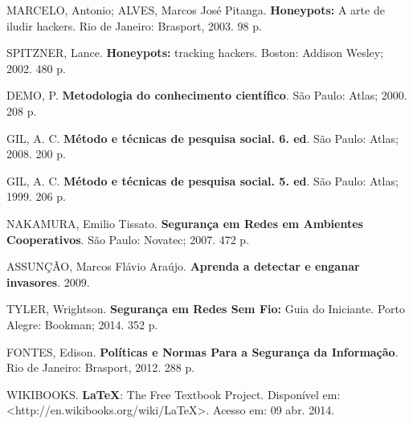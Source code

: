 \documentclass[12pt,openright,oneside,a4paper,english,french,spanish,brazil]{unifil}
\begin{document}
\begin{thebibliography}{99}

{MARCELO, Antonio; ALVES, Marcos José Pitanga. \textbf{Honeypots:} A arte de iludir hackers. Rio de Janeiro: Brasport, 2003. 98 p.}

{SPITZNER, Lance. \textbf{Honeypots:} tracking hackers. Boston: Addison Wesley; 2002. 480 p.}

{DEMO, P. \textbf{Metodologia do conhecimento científico}. São Paulo: Atlas; 2000. 208 p.}

{GIL, A. C. \textbf{Método e técnicas de pesquisa social. 6. ed}. São Paulo: Atlas; 2008. 200 p.}

{GIL, A. C. \textbf{Método e técnicas de pesquisa social. 5. ed}. São Paulo: Atlas; 1999. 206 p.}

{NAKAMURA, Emilio Tissato. \textbf{Segurança em Redes em Ambientes Cooperativos}. São Paulo: Novatec; 2007. 472 p.}

{ASSUNÇÃO, Marcos Flávio Araújo. \textbf{Aprenda a detectar e enganar invasores}. 2009.}

{TYLER, Wrightson. \textbf{Segurança em Redes Sem Fio:} Guia do Iniciante. Porto Alegre: Bookman; 2014. 352 p.}

{FONTES, Edison. \textbf{Políticas e Normas Para a Segurança da Informação}. Rio de Janeiro: Brasport, 2012. 288 p.}

{WIKIBOOKS. \textbf{LaTeX}: The Free Textbook Project. Disponível em: <http://en.wikibooks.org/wiki/LaTeX>. Acesso em: 09 abr. 2014.}


\end{thebibliography}
\end{document}

